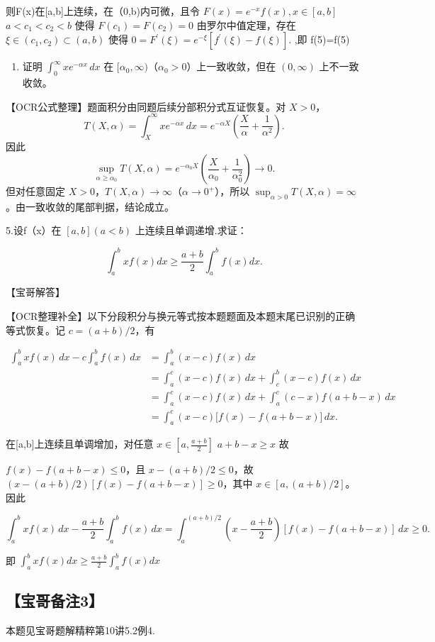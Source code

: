 \documentclass[11pt,fontset=fandol]{ctexart}
\providecommand{\tightlist}{\setlength{\itemsep}{0pt}\setlength{\parskip}{0pt}}
\begin{document}
则F(x)在{[}a,b{]}上连续，在（0,b)内可微，且令
\(F ( x ) = e ^ { - x } f ( x ) , x \in \left[ a , b \right]\)
\(a < c _ { 1 } < c _ { 2 } < b\) 使得
\(F ( c _ { 1 } ) = F ( c _ { 2 } ) = 0\) 由罗尔中值定理，存在
\(\xi \in ( c _ { 1 } , c _ { 2 } ) \subset ( a , b )\) 使得
\(0 = F ^ { \prime } ( \xi ) = e ^ { - \xi } \left[ f ^ { \prime } ( \xi ) - f ( \xi ) \right] .\)
,即 f(5)=f(5)

\begin{enumerate}
\def\labelenumi{\arabic{enumi}.}
\setcounter{enumi}{3}
\tightlist
\item
  证明 \(\int_0^\infty xe^{-\alpha x}\,dx\) 在
  \([\alpha_0,\infty)\)（\(\alpha_0>0\)）上一致收敛，但在 \((0,\infty)\)
  上不一致收敛。
\end{enumerate}

【OCR公式整理】题面积分由同题后续分部积分式互证恢复。对 \(X>0\)， \[
T(X,\alpha)=\int_X^\infty xe^{-\alpha x}\,dx
=e^{-\alpha X}\left(\frac X\alpha+\frac1{\alpha^2}\right).
\] 因此 \[
\sup_{\alpha\ge\alpha_0}T(X,\alpha)
=e^{-\alpha_0X}\left(\frac X{\alpha_0}+\frac1{\alpha_0^2}\right)\to0.
\] 但对任意固定
\(X>0\)，\(T(X,\alpha)\to\infty\)（\(\alpha\to0^+\)），所以
\(\sup_{\alpha>0}T(X,\alpha)=\infty\)。由一致收敛的尾部判据，结论成立。

5.设f（x）在 \(\left[ a , b \right] \left( a < b \right)\)
上连续且单调递增.求证：

\[
\int _ { a } ^ { b } x f ( x ) d x \geq { \frac { a + b } { 2 } } { \int _ { a } ^ { b } f ( x ) d x } .
\]

【宝哥解答】

【OCR整理补全】以下分段积分与换元等式按本题题面及本题末尾已识别的正确等式恢复。记
\(c=(a+b)/2\)，有

\[
\begin{aligned}
\int_a^b xf(x)\,dx-c\int_a^b f(x)\,dx
&=\int_a^b(x-c)f(x)\,dx\\
&=\int_a^c(x-c)f(x)\,dx+\int_c^b(x-c)f(x)\,dx\\
&=\int_a^c(x-c)f(x)\,dx+\int_a^c(c-x)f(a+b-x)\,dx\\
&=\int_a^c(x-c)\bigl[f(x)-f(a+b-x)\bigr]\,dx.
\end{aligned}
\]

在{[}a,b{]}上连续且单调增加，对任意
\(x \in \left[ a , { \frac { a + b } { 2 } } \right]\)
\(a + b - x \geq x\) 故

\(f(x)-f(a+b-x)\le0\)，且 \(x-(a+b)/2\le0\)，故
\((x-(a+b)/2)[f(x)-f(a+b-x)]\ge0\)，其中 \(x\in[a,(a+b)/2]\)。因此

\[
\int_a^b xf(x)\,dx-\frac{a+b}{2}\int_a^b f(x)\,dx
=\int_a^{(a+b)/2}\left(x-\frac{a+b}{2}\right)
[f(x)-f(a+b-x)]\,dx\ge0.
\]

即
\(\int _ { a } ^ { b } x f ( x ) d x \geq { \frac { a + b } { 2 } } \int _ { a } ^ { b } f ( x ) d x\)

\subsection{【宝哥备注3】}\label{ux5b9dux54e5ux5907ux6ce83}

本题见宝哥题解精粹第10讲5.2例4.
\end{document}
